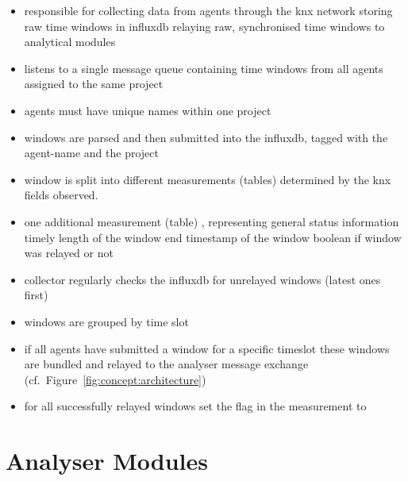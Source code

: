 \begin{itemize}
	\item responsible for
		\subitem collecting data from agents through the \gls{knx} network
		\subitem storing raw time windows in \gls{influxdb}
		\subitem relaying raw, synchronised time windows to analytical modules
	\item listens to a single message queue containing time windows from all agents assigned to the same project
	\item agents must have unique names within one project
	\item windows are parsed and then submitted into the \gls{influxdb}, tagged with the agent-name and the project
	\item window is split into different measurements (tables) determined by the \gls{knx} fields observed.
	\item one additional measurement (table) , representing general status information
		\subitem timely length of the window
		\subitem end timestamp of the window
		\subitem boolean if window was relayed or not
	\item collector regularly checks the \gls{influxdb} for unrelayed windows (latest ones first)
	\item windows are grouped by time slot
	\item if all agents have submitted a window for a specific timeslot these windows are bundled and relayed to the analyser message exchange (cf.~Figure~\ref{fig:concept:architecture})
	\item for all successfully relayed windows set the  flag in the  measurement to 
\end{itemize}

\section{Analyser Modules}
\label{sec:concept:anal}

